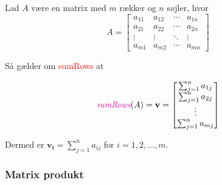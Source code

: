 \vspace{0.5cm}
\begin{definition} \label{sumRows}
Lad $A$ være en matrix med $m$ rækker og $n$ søjler, hvor
\[
A = \begin{bmatrix}
a_{11} & a_{12} & \cdots & a_{1n} \\
a_{21} & a_{22} & \cdots & a_{2n} \\
\vdots & \vdots & \ddots & \vdots \\
a_{m1} & a_{m2} & \cdots & a_{mn}
\end{bmatrix}
\]

Så gælder om \textcolor{red}{sumRows} at

\[
\textit{\textcolor{red}{sumRows}}(A) =
\mathbf{v} = \begin{bmatrix}
\sum_{j=1}^{n} a_{1j} \\
\sum_{j=1}^{n} a_{2j} \\
\vdots \\
\sum_{j=1}^{n} a_{mj}
\end{bmatrix}
\]

Dermed er $\mathbf{v_i} = \sum_{j=1}^{n} a_{ij}$ for $i = 1, 2, \ldots, m$.
\end{definition}

\subsubsection{Matrix produkt}


